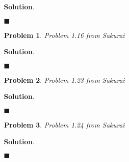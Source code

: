 \documentclass[12pt]{article}
\newtheorem{p}{Problem}
\theoremstyle{definition}
\newenvironment{s}{%
        \begin{trivlist} \item \textbf{Solution}. }{%
            \hspace*{\fill} $\blacksquare$\end{trivlist}}%
\begin{document}
{\begin{s} 

\end{s}

\begin{p}
Problem 1.16 from Sakurai
\end{p}

\begin{s} 

\end{s}

\begin{p}
Problem 1.23 from Sakurai
\end{p}

\begin{s} 

\end{s}

\begin{p}
Problem 1.24 from Sakurai
\end{p}

\begin{s} 

\end{s}
\end{document}
